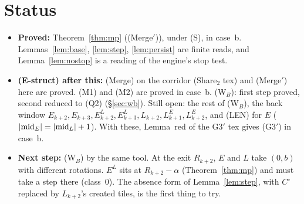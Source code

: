 \documentclass[11pt]{article}
\begin{document}
\section{Status}
\begin{itemize}
\item \textbf{Proved:} Theorem~\ref{thm:mp} ((Merge$'$)), under (S), in case~b. Lemmas~\ref{lem:base}, \ref{lem:step}, \ref{lem:persist} are finite reads, and Lemma~\ref{lem:nostop} is a reading of the engine's stop test.
\item \textbf{(E-struct) after this:} (Merge) on the corridor (Share$_2$ tex) and (Merge$'$) here are proved. (M1) and (M2) are proved in case~b. (W$_B$): first step proved, second reduced to (Q2) (\S\ref{sec:wb}). Still open: the rest of (W$_B$), the back window $E_{k+2},E_{k+3},E^L_{k+2},E^L_{k+3},L_{k+2},L^E_{k+1},L^E_{k+2}$, and (LEN) for $E$ ($|{\rm mid}_E|=|{\rm mid}_L|+1$). With these, Lemma~red of the G3$'$ tex gives (G3$'$) in case~b.
\item \textbf{Next step:} (W$_B$) by the same tool. At the exit $R_{k+2}$, $E$ and $L$ take $(0,b)$ with different rotations. $E^L$ sits at $R_{k+2}-\alpha$ (Theorem~\ref{thm:mp}) and must take a step there (class~0). The absence form of Lemma~\ref{lem:step}, with $C^\circ$ replaced by $L_{k+2}$'s created tiles, is the first thing to try.
\end{itemize}
\end{document}
